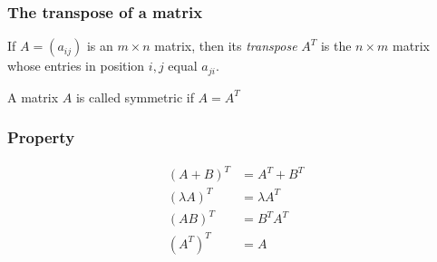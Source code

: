 \subsubsection{The transpose of a matrix}
If $A = (a_{ij})$ is an $m \times n$ matrix, then its \emph{transpose} $A^T$ is the $n \times m$ matrix whose entries
in position $i,j$ equal $a_{ji}$.
\par A matrix $A$ is called symmetric if $A = A^T$

\subsubsection{Property}
\begin{align*}
(A+B)^T & = A^T + B^T \\
(\lambda A)^T & = \lambda A^T \\
(AB)^T & = B^TA^T \\
(A^T)^T & = A
\end{align*}


